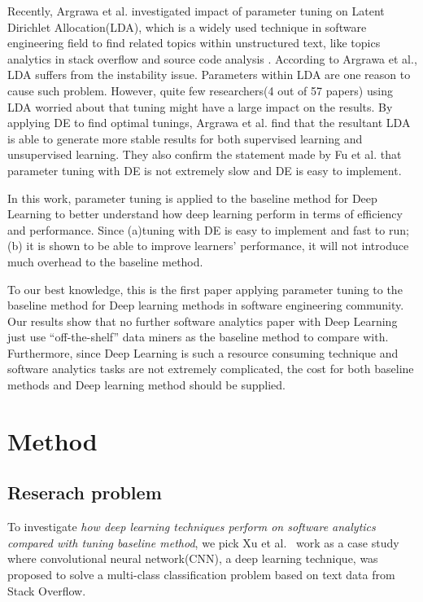 \documentclass[sigconf,review, anonymous]{acmart}
\theoremstyle{break}
\begin{document}
Recently, Argrawa et al.\cite{agrawal2016wrong} investigated 
impact of parameter tuning on Latent Dirichlet Allocation(LDA),
which is a widely used technique in software engineering field
to find related topics within unstructured text, 
like topics analytics in stack overflow \cite{barua2014developers}
and source code analysis \cite{binkley2014understanding}.
According to Argrawa et al., LDA suffers from the instability issue.
Parameters within LDA are one reason to cause such problem. However,
quite few researchers(4 out of 57 papers) using LDA worried about
that tuning might have a large impact on the results. By applying DE to find 
optimal tunings,  Argrawa et al. find that the resultant LDA is able to generate more stable results
for both supervised learning and unsupervised learning.
They also confirm the statement made by Fu et al.\cite{fu2016tuning} that
parameter tuning with DE is not extremely slow and DE is easy to implement.

In this work, parameter tuning is applied to the baseline method for Deep Learning
to better understand how deep learning perform in terms of efficiency and performance.
Since (a)tuning with DE is easy to implement and fast to run; (b) it is shown to be able
to improve learners' performance, it will not introduce much overhead to the baseline method.

To our best knowledge, this is the first paper
applying parameter tuning to the baseline method for Deep learning methods in 
software engineering community. Our results show that no further software analytics
paper with Deep Learning just use ``off-the-shelf'' data miners as the baseline
method to compare with. Furthermore, since Deep Learning is such a resource consuming
technique and software analytics tasks are not extremely complicated, the cost for 
both baseline methods and Deep learning method should be supplied.



\section{Method}

\subsection{Reserach problem}\label{problem}
To investigate {\it how deep learning techniques perform on software analytics compared 
with tuning baseline method}, we pick Xu et al.~\cite{xu2016predicting} work as a case study
where convolutional neural network(CNN), a deep learning technique, was proposed to 
solve a multi-class classification problem based on text data from Stack Overflow.
\end{document}
